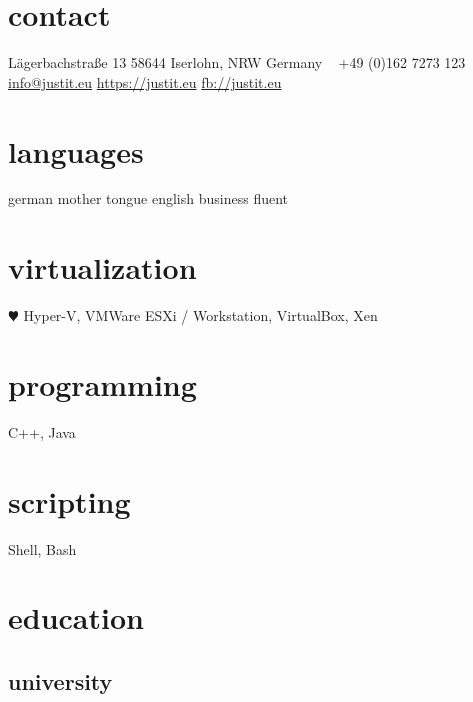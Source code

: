\documentclass[]{friggeri-cv} %
\begin{document}


\begin{aside} %
\section{contact}
Lägerbachstraße 13
58644 Iserlohn, NRW
Germany
~
+49 (0)162 7273 123
~
\href{mailto:info@justit.eu}{info@justit.eu}
\href{https://justit.eu}{https://justit.eu}
\href{https://www.facebook.com/justit.eu}{fb://justit.eu}
\section{languages}
german mother tongue
english business fluent
\section{virtualization}
{\color{red} $\varheartsuit$} Hyper-V,
VMWare ESXi / Workstation, VirtualBox, Xen
\section{programming}
C++, Java
\section{scripting}
Shell, Bash
\end{aside}


\section{education}
\subsection{university}
\end{document}
